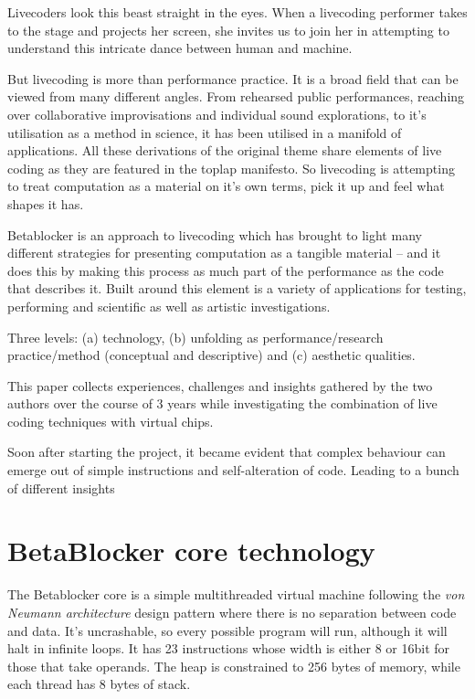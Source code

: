 \documentclass[letterpaper, 12pt]{article}
\begin{document}
Livecoders look this beast straight in the eyes. 
When a livecoding performer takes to the stage and projects her screen, she invites us to join her in attempting to understand this intricate dance between human and machine. 

But livecoding is more than performance practice.
It is a broad field that can be viewed from many different angles.
From rehearsed public performances, reaching over collaborative improvisations and individual sound explorations, to it's utilisation as a method in science, it has been utilised in a manifold of applications.
All these derivations of the original theme share elements of live coding as they are featured in the toplap manifesto.
So livecoding is attempting to treat computation as a material on it's own terms, pick it up and feel what shapes it has.

Betablocker is an approach to livecoding which has brought to light many different strategies for presenting computation as a tangible material -- and it does this by making this process as much part of the performance as the code that describes it.
Built around this element is a variety of applications for testing, performing and scientific as well as artistic investigations.

Three levels: (a) technology, (b) unfolding as performance/research practice/method (conceptual and descriptive) and (c) aesthetic qualities.


This paper collects experiences, challenges and insights gathered by the two authors over the course of 3 years while investigating the combination of live coding techniques with virtual chips.

Soon after starting the project, it became evident that complex behaviour can emerge out of simple instructions and self-alteration of code.
Leading to a bunch of different insights

\parskip 18pt

\section{BetaBlocker core technology} 
\label{sec:betablocker_core}


The Betablocker core is a simple multithreaded virtual machine following the \emph{von Neumann architecture} design pattern where there is no separation between code and data.
It's uncrashable, so every possible program will run, although it will halt in infinite loops. 
It has 23 instructions whose width is either 8 or 16bit for those that take operands. The heap is constrained to 256 bytes of memory, while each thread has 8 bytes of stack. 
\end{document}
